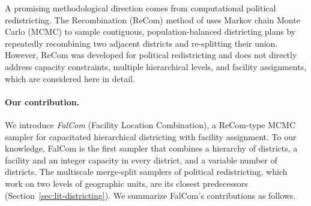 \documentclass[preprint,12pt,authoryear]{elsarticle}
\theoremstyle{definition}
\begin{document}
A promising methodological direction comes from computational political redistricting. 
The Recombination (ReCom) method of \citet{deford2021recombination} uses 
Markov chain Monte Carlo (MCMC) to sample contiguous, population-balanced districting 
plans by repeatedly recombining two adjacent districts and re-splitting their union. 
However, ReCom was developed for political redistricting and does not directly address 
capacity constraints, multiple hierarchical levels, and facility assignments, 
which are considered here in detail.

\paragraph{Our contribution.}
We introduce \emph{FalCom} (Facility Location Combination), a
ReCom-type MCMC sampler for capacitated hierarchical districting
with facility assignment. To our knowledge, FalCom is the first sampler that combines a hierarchy of districts, a facility and an integer capacity in every district, and a variable number of districts. The multiscale merge-split samplers of political redistricting, which work on two levels of geographic units, are its closest predecessors (Section~\ref{sec:lit-districting}).
We summarize FalCom's contributions as follows.
\vspace{2mm}
\end{document}
